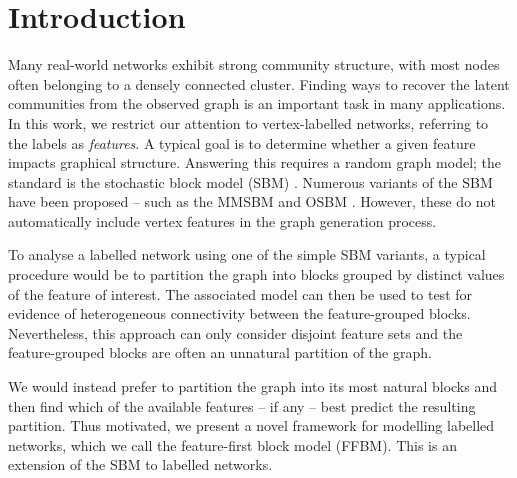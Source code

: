 \section{Introduction}

Many real-world networks exhibit strong community structure, with most nodes often belonging to a densely connected cluster. 
Finding ways to recover the latent communities from the observed graph is an important
task in many applications. In this work, we restrict our attention to vertex-labelled networks, 
referring to the labels as {\em features}. A typical goal is to determine whether a given feature impacts graphical structure. Answering this requires a random graph model; the standard is the stochastic block model (SBM) \cite{vanilla-sbm}. Numerous variants of the SBM  have been proposed -- such as the MMSBM \cite{mixed-membership-sbm} and OSBM \cite{overlapping-sbm}. However, these do not automatically include vertex features in the graph generation process.

To analyse a labelled network using one of the simple SBM variants, a typical procedure would be to partition the graph into blocks grouped by distinct values of the feature of interest. The associated model can then be used to test for evidence of heterogeneous connectivity between the feature-grouped blocks. Nevertheless, this approach can only consider disjoint feature sets and the feature-grouped blocks are often an unnatural partition of the graph.

We would instead prefer to partition the graph into its most natural blocks and then find which of the available features -- if any -- best predict the resulting partition. Thus motivated, we present a novel framework for modelling labelled networks, which we call the feature-first block model (FFBM). This is an extension of the SBM to labelled networks.
